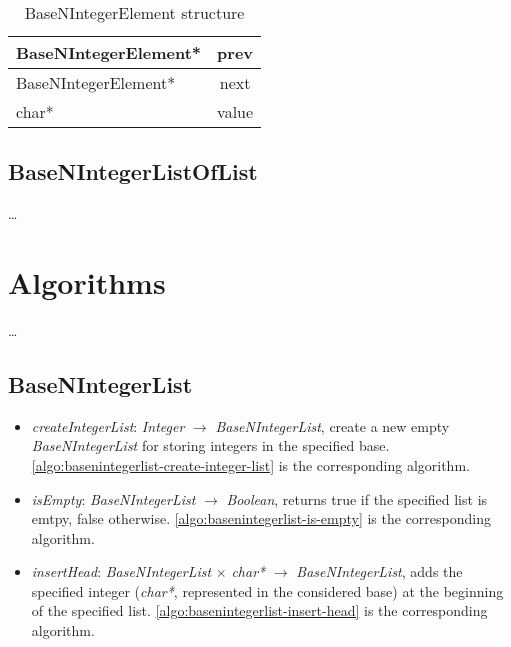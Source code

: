 \documentclass[book, nodocumentinfo]{upmethodology-document}
\begin{document}
\begin{table}[h]
    \centering
    \label{tab:basenintegerelement-struct}

    \begin{tabular}{|l|c|}
        \hline
        BaseNIntegerElement* & prev \\
        \hline
        BaseNIntegerElement* & next \\
        \hline
        char* & value \\
        \hline
    \end{tabular}

    \caption{BaseNIntegerElement structure}
\end{table}

\section{BaseNIntegerListOfList}

…

\chapter{Algorithms}

…

\section{BaseNIntegerList}

\begin{itemize}
    \item \emph{createIntegerList}: \emph{Integer} \(\rightarrow\) \emph{BaseNIntegerList},
        create a new empty \emph{BaseNIntegerList} for storing integers in the specified base.
        \ref{algo:basenintegerlist-create-integer-list} is the corresponding algorithm.
    \item \emph{isEmpty}: \emph{BaseNIntegerList} \(\rightarrow\) \emph{Boolean},
        returns true if the specified list is emtpy, false otherwise.
        \ref{algo:basenintegerlist-is-empty} is the corresponding algorithm.
    \item \emph{insertHead}: \emph{BaseNIntegerList} \(\times\) \emph{char*} \(\rightarrow\) \emph{BaseNIntegerList},
        adds the specified integer (\emph{char*}, represented in the considered base) at the beginning
        of the specified list.
        \ref{algo:basenintegerlist-insert-head} is the corresponding algorithm.
\end{itemize}
\end{document}
